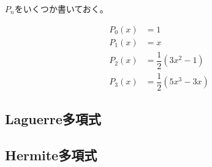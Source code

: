 $P_n$をいくつか書いておく。

\begin{align}
	P_0(x) &= 1 \\
	P_1(x) &= x \\
	P_2(x) &= \dfrac{1}{2}(3x^2 - 1) \\
	P_3(x) &= \dfrac{1}{2}(5x^3 - 3x)
\end{align}



\subsection{Laguerre多項式}
\subsection{Hermite多項式}
